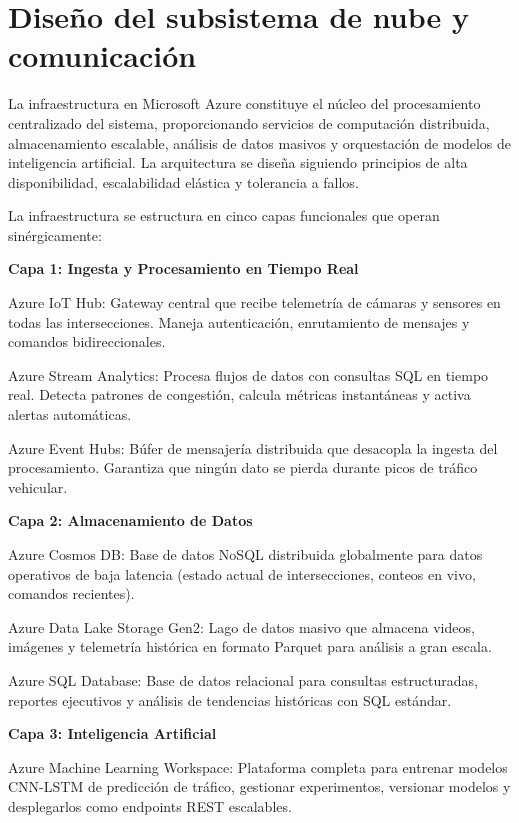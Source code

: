 \documentclass[12pt,a4paper,oneside]{report}
\begin{document}
\section{Diseño del subsistema de nube y comunicación}\label{diseuxf1o-del-subsistema-de-nube-y-comunicaciuxf3n}

La infraestructura en Microsoft Azure constituye el núcleo del procesamiento centralizado del sistema, proporcionando servicios de computación distribuida, almacenamiento escalable, análisis de datos masivos y orquestación de modelos de inteligencia artificial. La arquitectura se diseña siguiendo principios de alta disponibilidad, escalabilidad elástica y tolerancia a fallos.

La infraestructura se estructura en cinco capas funcionales que operan sinérgicamente:

\textbf{Capa 1: Ingesta y Procesamiento en Tiempo Real}

Azure IoT Hub: Gateway central que recibe telemetría de cámaras y sensores en todas las intersecciones. Maneja autenticación, enrutamiento de mensajes y comandos bidireccionales.

Azure Stream Analytics: Procesa flujos de datos con consultas SQL en tiempo real. Detecta patrones de congestión, calcula métricas instantáneas y activa alertas automáticas.

Azure Event Hubs: Búfer de mensajería distribuida que desacopla la ingesta del procesamiento. Garantiza que ningún dato se pierda durante picos de tráfico vehicular.

\textbf{Capa 2: Almacenamiento de Datos}

Azure Cosmos DB: Base de datos NoSQL distribuida globalmente para datos operativos de baja latencia (estado actual de intersecciones, conteos en vivo, comandos recientes).

Azure Data Lake Storage Gen2: Lago de datos masivo que almacena videos, imágenes y telemetría histórica en formato Parquet para análisis a gran escala.

Azure SQL Database: Base de datos relacional para consultas estructuradas, reportes ejecutivos y análisis de tendencias históricas con SQL estándar.

\textbf{Capa 3: Inteligencia Artificial}

Azure Machine Learning Workspace: Plataforma completa para entrenar modelos CNN-LSTM de predicción de tráfico, gestionar experimentos, versionar modelos y desplegarlos como endpoints REST escalables.
\end{document}
